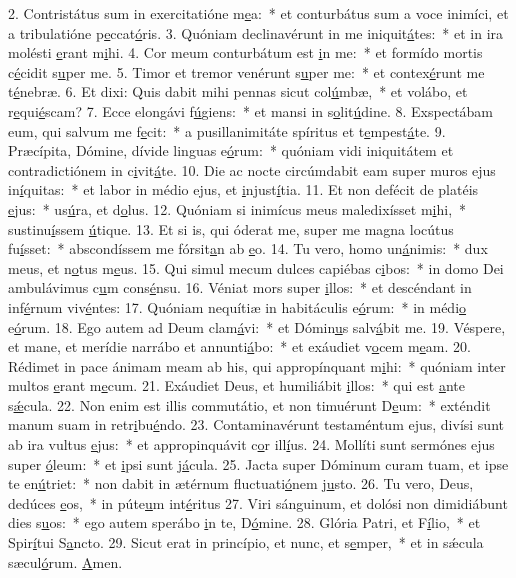 2. Contristátus sum in exercitatióne m\uline{e}a:~* et conturbátus sum a voce inimíci, et a tribulatióne p\uline{e}ccat\uline{ó}ris.
3. Quóniam declinavérunt in me iniquit\uline{á}tes:~* et in ira molésti \uline{e}rant m\uline{i}hi.
4. Cor meum conturbátum est \uline{i}n me:~* et formído mortis c\uline{é}cidit s\uline{u}per me.
5. Timor et tremor venérunt s\uline{u}per me:~* et contex\uline{é}runt me t\uline{é}nebræ.
6. Et dixi: Quis dabit mihi pennas sicut col\uline{ú}mbæ,~* et volábo, et r\uline{e}qui\uline{é}scam?
7. Ecce elongávi f\uline{ú}giens:~* et mansi in s\uline{o}lit\uline{ú}dine.
8. Exspectábam eum, qui salvum me f\uline{e}cit:~* a pusillanimitáte spíritus et t\uline{e}mpest\uline{á}te.
9. Præcípita, Dómine, dívide linguas e\uline{ó}rum:~* quóniam vidi iniquitátem et contradictiónem in c\uline{i}vit\uline{á}te.
10. Die ac nocte circúmdabit eam super muros ejus in\uline{í}quitas:~* et labor in médio ejus, et \uline{i}njust\uline{í}tia.
11. Et non defécit de platéis \uline{e}jus:~* us\uline{ú}ra, et d\uline{o}lus.
12. Quóniam si inimícus meus maledixísset m\uline{i}hi,~* sustinu\uline{í}ssem \uline{ú}tique.
13. Et si is, qui óderat me, super me magna locútus fu\uline{í}sset:~* abscondíssem me fórsit\uline{a}n ab \uline{e}o.
14. Tu vero, homo un\uline{á}nimis:~* dux meus, et n\uline{o}tus m\uline{e}us.
15. Qui simul mecum dulces capiébas c\uline{i}bos:~* in domo Dei ambulávimus c\uline{u}m cons\uline{é}nsu.
16. Véniat mors super \uline{i}llos:~* et descéndant in inf\uline{é}rnum viv\uline{é}ntes:
17. Quóniam nequítiæ in habitáculis e\uline{ó}rum:~* in médi\uline{o} e\uline{ó}rum.
18. Ego autem ad Deum clam\uline{á}vi:~* et Dómin\uline{u}s salv\uline{á}bit me.
19. Véspere, et mane, et merídie narrábo et annunti\uline{á}bo:~* et exáudiet v\uline{o}cem m\uline{e}am.
20. Rédimet in pace ánimam meam ab his, qui appropínquant m\uline{i}hi:~* quóniam inter multos \uline{e}rant m\uline{e}cum.
21. Exáudiet Deus, et humiliábit \uline{i}llos:~* qui est \uline{a}nte s\uline{ǽ}cula.
22. Non enim est illis commutátio, et non timuérunt D\uline{e}um:~* exténdit manum suam in retr\uline{i}bu\uline{é}ndo.
23. Contaminavérunt testaméntum ejus, divísi sunt ab ira vultus \uline{e}jus:~* et appropinquávit c\uline{o}r ill\uline{í}us.
24. Mollíti sunt sermónes ejus super \uline{ó}leum:~* et \uline{i}psi sunt j\uline{á}cula.
25. Jacta super Dóminum curam tuam, et ipse te en\uline{ú}triet:~* non dabit in ætérnum fluctuati\uline{ó}nem j\uline{u}sto.
26. Tu vero, Deus, dedúces \uline{e}os,~* in púte\uline{u}m int\uline{é}ritus
27. Viri sánguinum, et dolósi non dimidiábunt dies s\uline{u}os:~* ego autem sperábo \uline{i}n te, D\uline{ó}mine.
28. Glória Patri, et F\uline{í}lio,~* et Spir\uline{í}tui S\uline{a}ncto.
29. Sicut erat in princípio, et nunc, et s\uline{e}mper,~* et in sǽcula sæcul\uline{ó}rum. \uline{A}men.
